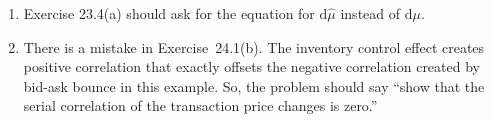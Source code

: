 \documentclass[11pt]{book}
\newcommand{\D}{\mathrm{d}}
\theoremstyle{definition}
\begin{document}
\begin{enumerate}
\item Exercise 23.4(a) should ask for the equation for $\D \hat{\mu}$ instead of $\D \mu$.
\item There is a mistake in Exercise~24.1(b). The inventory control effect creates positive correlation that exactly offsets the negative correlation created by bid-ask bounce in this example.  So, the problem should say ``show that the serial correlation of the transaction price changes is zero.''  
\end{enumerate}
\end{document}

